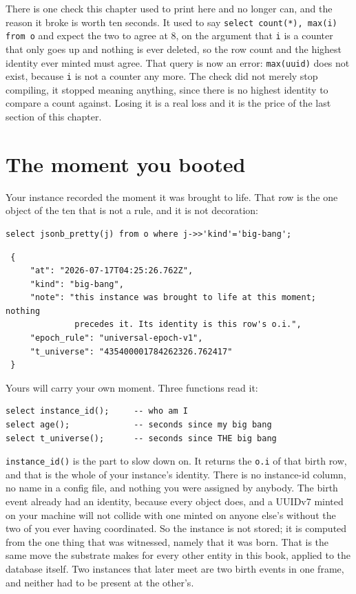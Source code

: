 There is one check this chapter used to print here and no longer can, and the reason it broke is worth ten seconds. It used to say \verb|select count(*), max(i) from o| and expect the two to agree at 8, on the argument that \verb|i| is a counter that only goes up and nothing is ever deleted, so the row count and the highest identity ever minted must agree. That query is now an error: \verb|max(uuid)| does not exist, because \verb|i| is not a counter any more. The check did not merely stop compiling, it stopped meaning anything, since there is no highest identity to compare a count against. Losing it is a real loss and it is the price of the last section of this chapter.

\section{The moment you booted}

Your instance recorded the moment it was brought to life. That row is the one object of the ten that is not a rule, and it is not decoration:

\begin{verbatim}
select jsonb_pretty(j) from o where j->>'kind'='big-bang';
\end{verbatim}

\begin{verbatim}
 {
     "at": "2026-07-17T04:25:26.762Z",
     "kind": "big-bang",
     "note": "this instance was brought to life at this moment; nothing
              precedes it. Its identity is this row's o.i.",
     "epoch_rule": "universal-epoch-v1",
     "t_universe": "435400001784262326.762417"
 }
\end{verbatim}

Yours will carry your own moment. Three functions read it:

\begin{verbatim}
select instance_id();     -- who am I
select age();             -- seconds since my big bang
select t_universe();      -- seconds since THE big bang
\end{verbatim}

\verb|instance_id()| is the part to slow down on. It returns the \verb|o.i| of that birth row, and that is the whole of your instance's identity. There is no instance-id column, no name in a config file, and nothing you were assigned by anybody. The birth event already had an identity, because every object does, and a UUIDv7 minted on your machine will not collide with one minted on anyone else's without the two of you ever having coordinated. So the instance is not stored; it is computed from the one thing that was witnessed, namely that it was born. That is the same move the substrate makes for every other entity in this book, applied to the database itself. Two instances that later meet are two birth events in one frame, and neither had to be present at the other's.

